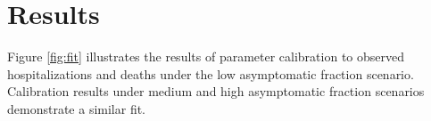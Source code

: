 \documentclass[11pt]{article}
\newcommand{\comments}[1]{[\textcolor{red}{#1}]}
\newcommand{\ZLcomment}[1]{[\textcolor{red}{Richard: #1}]}
\begin{document}








\section{Results}

Figure \ref{fig:fit} illustrates the results of parameter calibration to observed hospitalizations and deaths under the low asymptomatic fraction scenario. 
Calibration results under medium and high asymptomatic fraction scenarios demonstrate a similar fit.
\end{document}
